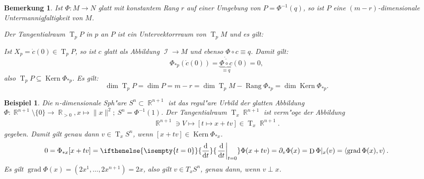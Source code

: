 \documentclass[paper=A4, twoside, chapterprefix=true, bibliography=totoc, headsepline]{scrbook}
\newcommand{\tikzschnuller}[2][1]{
	\coordinate (schnuller1) at #2;
	\coordinate (schnuller2) at ($(schnuller1)+#1*(-1.75,-0.75)$);
	\coordinate (schnuller3) at ($(schnuller1)+#1*(-2.5,-2.25)$);
	\coordinate (schnuller4) at ($(schnuller1)+#1*(0,-2)$);
	\coordinate (schnuller5) at ($(schnuller1)+#1*(1.75,-0.25)$);
    
    \coordinate (ctrls1) at ($#1*(1.25,0.25)$);
    \coordinate (ctrls2) at ($-0.5*(ctrls1)$);
    \coordinate (ctrls4) at ($#1*(1,-1)$);
    \coordinate (ctrls3) at ($-0.5*(ctrls4)$);
    \coordinate (ctrls6) at ($#1*(1,1.5)$);
    \coordinate (ctrls5) at ($-0.33*(ctrls6)$);

    \coordinate (tang1) at ($(schnuller2)+(ctrls1)$);
    \coordinate (tang2) at ($(schnuller2)+(ctrls2)$);
    \coordinate (tang3) at ($(schnuller3)+(ctrls3)$);
    \coordinate (tang4) at ($(schnuller3)+(ctrls4)$);
    \coordinate (tang5) at ($(schnuller4)+(ctrls5)$);
    \coordinate (tang6) at ($(schnuller4)+(ctrls6)$);
	
	\draw (schnuller1) ..controls(schnuller1) and (tang1).. (schnuller2) ..controls(tang2) and (tang3).. (schnuller3) ..controls(tang4) and (tang5).. (schnuller4) ..controls(tang6) and (schnuller5).. (schnuller5);
	
	\def\angle{20} %
	\coordinate (c) at ($#2+#1*(-1.25,-1.25)$); %
	\begin{scope}
		\clip[rotate=\angle] ($(c)-#1*(1,0.6)$) rectangle ($(c)+#1*(1,-0.1)$);
		\path[draw,rotate=\angle,name path=l] (c) ellipse(#1*1 and #1*0.5);
	\end{scope}
	\path[name path=u,rotate=\angle] ($(c)-#1*(0,0.5)$) ellipse(#1*0.75 and #1*0.5);
	\path[name intersections={of=u and l}];
	\begin{scope}
		\clip[rotate=\angle] (intersection-1) rectangle ($(intersection-2)+#1*(0,0.5)$);
		\draw[rotate=\angle] ($(c)-#1*(0,0.5)$) ellipse(#1*0.75 and #1*0.5);
	\end{scope}		
}
\newcommand{\tikzsegel}[2][1]{
	\coordinate (segel1) at #2; \coordinate (segel2) at ($(segel1)+#1*(4,1.5)$); \coordinate (segel3) at ($(segel1)+#1*(2,-0.5)$);
	
	\coordinate (ctrls1) at ($#1*(0.75,1.5)$);
	\coordinate (ctrls2) at ($#1*(-0.75,0.25)$);
	\coordinate (ctrls3) at ($#1*(-0.5,-0.25)$);
	\coordinate (ctrls4) at ($#1*(0.25,1)$);
	\coordinate (ctrls5) at ($#1*(-0.375,0.375)$);
	\coordinate (ctrls6) at ($#1*(0.75,0.125)$);
	\coordinate (tang1) at ($(segel1)+(ctrls1)$);
	\coordinate (tang2) at ($(segel2)+(ctrls2)$);
	\coordinate (tang3) at ($(segel2)+(ctrls3)$);
	\coordinate (tang4) at ($(segel3)+(ctrls4)$);
	\coordinate (tang5) at ($(segel3)+(ctrls5)$);
	\coordinate (tang6) at ($(segel1)+(ctrls6)$);
	
	\draw (segel1) ..controls(tang1) and (tang2).. (segel2) ..controls(tang3) and (tang4).. (segel3) ..controls(tang5) and (tang6).. (segel1) --cycle;
}
\DeclareMathOperator{\R}{\mathbb{R}}
\DeclareMathOperator{\calI}{\mathcal{I}}
\DeclareMathOperator{\grad}{grad}   %
\DeclareMathOperator{\D}{D}         %
\DeclareMathOperator{\Kern}{Kern}
\DeclareMathOperator{\Rang}{Rang}   %
\DeclareMathOperator{\T}{T}         %
\newcommand{\dop}{\mathrm{d}}
\newcommand{\difffrac}[3][]{\ifthenelse{\isempty{#1}}{\frac{\dop #2}{\dop #3}}{\left. \frac{\dop #2}{\dop #3} \right|_{#1}}}
\theoremstyle{plain}
\newtheorem{Bsp}[Dfn]{Beispiel}
\theoremstyle{nonumberplain}
\newtheorem{bem}{Bemerkung}
\theoremstyle{empty}
\theoremstyle{break}
\begin{document}
\begin{bem}
  Ist $\Phi \colon M \to N$ glatt mit konstantem Rang $r$ auf einer Umgebung von $P = \Phi^{-1}(q)$, so ist $P$ eine $(m-r)$-dimensionale Untermannigfaltigkeit von $M$.
  
  Der Tangentialraum $\T_pP$ in $p$ an $P$ ist ein Untervektorrraum von $\T_pM$ und es gilt:
  \begin{center}\end{center}

  Ist $X_p = \dot c(0) \in \T_pP$, so ist $c$ glatt als Abbildung $\calI \to M$ und ebenso $\Phi \circ c \equiv q$.
  Damit gilt:
    \[ \Phi_{*p}(\dot c(0)) = \dot{\underbrace{\overline{\Phi \circ c}}_{\equiv q}}(0) = 0, \]
  also $\T_pP \subseteq \Kern \Phi_{*p}$. Es gilt:
   \[ \dim \T_pP = \dim P = m-r = \dim \T_pM - \Rang \Phi_{*p} = \dim \Kern \Phi_{*p}. \]
\end{bem}

\begin{Bsp}
  Die $n$-dimensionale Sph"are $S^n \subset \R^{n+1}$ ist das regul"are Urbild der glatten Abbildung $\Phi \colon \R^{n+1}\setminus \{0\} \to \R_{> 0}, x \mapsto \|x\|^2; \ S^n = \Phi^{-1}(1)$. Der Tangentialraum $\T_x\R^{n+1}$ ist verm"oge der Abbildung
\begin{align*}
  \R^{n+1} \ni V \mapsto [t \mapsto x + tv] \in \T_x\R^{n+1}.
\end{align*}
gegeben. Damit gilt genau dann $v \in \T_xS^n$, wenn $[x+tv] \in \Kern \Phi_{*x}$.
\begin{align*}
  0 = \Phi_{*x}[x+tv] = \difffrac[t=0]{}{t} \Phi(x+tv) = \partial_v \Phi(x) = \D \Phi|_x(v) = \left<\grad\Phi(x),v\right>.
\end{align*}
Es gilt $\grad \Phi(x) = (2x^1, \ldots, 2x^{n+1}) = 2x$, also gilt $v \in T_xS^n$, genau dann, wenn $v \perp x$.
\end{Bsp}
\end{document}
